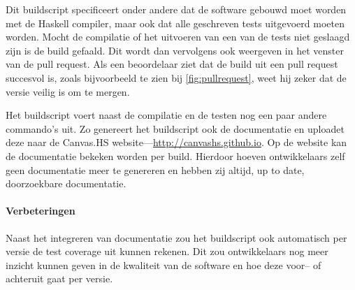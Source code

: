 Dit buildscript specificeert onder andere dat de software gebouwd moet worden met de Haskell compiler, maar ook dat alle geschreven tests uitgevoerd moeten worden. Mocht de compilatie of het uitvoeren van een van de tests niet geslaagd zijn is de build gefaald. Dit wordt dan vervolgens ook weergeven in het venster van de pull request. Als een beoordelaar ziet dat de build uit een pull request succesvol is, zoals bijvoorbeeld te zien bij \autoref{fig:pullrequest}, weet hij zeker dat de versie veilig is om te mergen.

Het buildscript voert naast de compilatie en de testen nog een paar andere commando's uit. Zo genereert het buildscript ook de documentatie en uploadet deze naar de Canvas.HS website—\url{http://canvashs.github.io}. Op de website kan de documentatie bekeken worden per build. Hierdoor hoeven ontwikkelaars zelf geen documentatie meer te genereren en hebben zij altijd, up to date, doorzoekbare documentatie.

\paragraph{Verbeteringen} Naast het integreren van documentatie zou het buildscript ook automatisch per versie de test coverage uit kunnen rekenen. Dit zou ontwikkelaars nog meer inzicht kunnen geven in de kwaliteit van de software en hoe deze voor– of achteruit gaat per versie.

